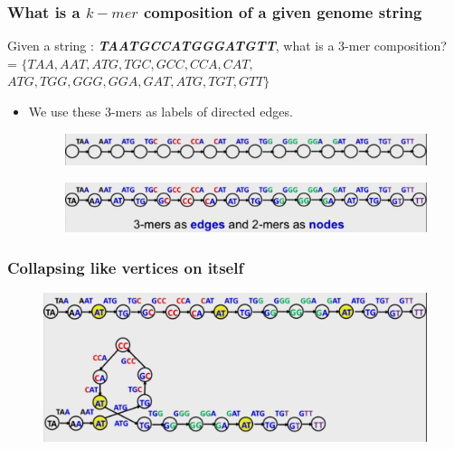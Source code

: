 \documentclass{beamer}
\begin{document}

\begin{frame}
\frametitle{What is a $k-mer$ composition of a given genome string}

Given a string : \textbf{\textit{TAATGCCATGGGATGTT}}, what is a 3-mer composition?\\
= $\{TAA, AAT, ATG, TGC, GCC, CCA, CAT,$\\ $ ATG, TGG, GGG, GGA, GAT, ATG, TGT, GTT\}$
\begin{itemize}
\item We use these 3-mers as labels of directed edges.
\pause
\begin{figure}[h]
\includegraphics[scale = 0.4]{3mer.png}
\end{figure}
\pause
\begin{figure}[h]
\includegraphics[scale = 0.4]{3mer2mer.png}
\end{figure}
\end{itemize}
\end{frame}


\begin{frame}
\frametitle{Collapsing like vertices on itself}
\begin{figure}[h]
\includegraphics[scale = 0.4]{gluing.png}
\end{figure}
\end{frame}

\end{document}
